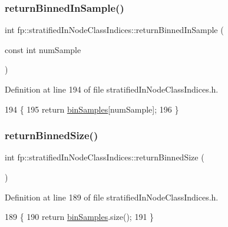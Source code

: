 \subsubsection{\texorpdfstring{return\+Binned\+In\+Sample()}{returnBinnedInSample()}}
{\footnotesize\ttfamily int fp\+::stratified\+In\+Node\+Class\+Indices\+::return\+Binned\+In\+Sample (\begin{DoxyParamCaption}\item[{const int}]{num\+Sample }\end{DoxyParamCaption})\hspace{0.3cm}{\ttfamily [inline]}}



Definition at line 194 of file stratified\+In\+Node\+Class\+Indices.\+h.


\begin{DoxyCode}
194                                                                 \{
195                 \textcolor{keywordflow}{return}  \hyperlink{classfp_1_1stratifiedInNodeClassIndices_a399e239f3f3175e44ca409be96de0d32}{binSamples}[numSample];
196             \}
\end{DoxyCode}
\mbox{\label{classfp_1_1stratifiedInNodeClassIndices_a9f77fe5e638170c4ad4ce99541561cfc}} 
\subsubsection{\texorpdfstring{return\+Binned\+Size()}{returnBinnedSize()}}
{\footnotesize\ttfamily int fp\+::stratified\+In\+Node\+Class\+Indices\+::return\+Binned\+Size (\begin{DoxyParamCaption}{ }\end{DoxyParamCaption})\hspace{0.3cm}{\ttfamily [inline]}}



Definition at line 189 of file stratified\+In\+Node\+Class\+Indices.\+h.


\begin{DoxyCode}
189                                          \{
190                 \textcolor{keywordflow}{return} \hyperlink{classfp_1_1stratifiedInNodeClassIndices_a399e239f3f3175e44ca409be96de0d32}{binSamples}.size();
191             \}
\end{DoxyCode}
\mbox{\label{classfp_1_1stratifiedInNodeClassIndices_a044392c507fe54073f55f5ae6aceac5f}} 
